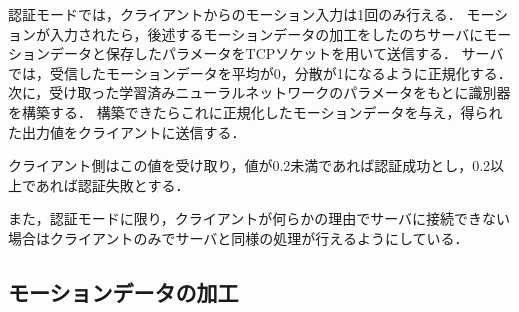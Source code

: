 認証モードでは，クライアントからのモーション入力は1回のみ行える．
モーションが入力されたら，後述するモーションデータの加工をしたのちサーバにモーションデータと保存したパラメータをTCPソケットを用いて送信する．
サーバでは，受信したモーションデータを平均が0，分散が1になるように正規化する．
次に，受け取った学習済みニューラルネットワークのパラメータをもとに識別器を構築する．
構築できたらこれに正規化したモーションデータを与え，得られた出力値をクライアントに送信する．

クライアント側はこの値を受け取り，値が0.2未満であれば認証成功とし，0.2以上であれば認証失敗とする．

また，認証モードに限り，クライアントが何らかの理由でサーバに接続できない場合はクライアントのみでサーバと同様の処理が行えるようにしている．

\subsection{モーションデータの加工}

